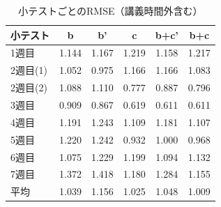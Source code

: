 \documentclass[a4paper,12pt]{ltjsreport}
\begin{document}
\begin{table}[tbp]
  \centering
  \caption{小テストごとのRMSE（講義時間外含む）}
  \label{tb:rmse_each_soto}
  \begin{tabular}{l||c|c|c|c|c}
    小テスト & b & b' & c & b+c' & b+c \\ \hline\hline
    1週目 & 1.144 & 1.167 & 1.219 & 1.158 & 1.217 \\ \hline
    2週目(1)  & 1.052 & 0.975 & 1.166 & 1.166 & 1.083 \\ \hline
    2週目(2)  & 1.088 & 1.110 & 0.777 & 0.887 & 0.796 \\ \hline
    3週目 & 0.909 & 0.867 & 0.619 & 0.611 & 0.611 \\ \hline
    4週目 & 1.191 & 1.243 & 1.109 & 1.181 & 1.107 \\ \hline
    5週目 & 1.220 & 1.242 & 0.932 & 1.000 & 0.968 \\ \hline
    6週目 & 1.075 & 1.229 & 1.199 & 1.094 & 1.132 \\ \hline
    7週目 & 1.372 & 1.418 & 1.180 & 1.284 & 1.155 \\ \hline\hline
    平均 & 1.039 & 1.156 & 1.025 & 1.048 & 1.009 \\ \hline
  \end{tabular}
\end{table}
\end{document}
